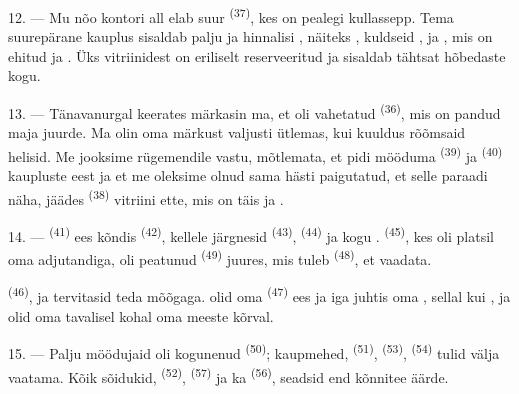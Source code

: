 12. --- Mu nõo kontori all elab suur 
\textsuperscript{(37)}, kes on pealegi kullassepp. Tema suurepärane kauplus sisaldab
palju  ja hinnalisi
, näiteks , kuldseid ,
 ja , mis on ehitud  ja
. Üks vitriinidest on eriliselt reserveeritud 
ja sisaldab tähtsat hõbedaste  kogu.

13. --- Tänavanurgal keerates märkasin ma, et oli vahetatud 
\textsuperscript{(36)}, mis on pandud maja  juurde. Ma olin oma märkust
valjusti ütlemas, kui kuuldus  rõõmsaid helisid. Me jooksime
rügemendile vastu, mõtlemata, et  pidi mööduma 
\textsuperscript{(39)} ja  \textsuperscript{(40)} kaupluste eest ja
et me oleksime olnud sama hästi paigutatud, et selle paraadi näha, jäädes
 \textsuperscript{(38)} vitriini ette, mis on täis  ja .

\VUsaut{3.0mm}

14. ---  \textsuperscript{(41)} ees kõndis 
\textsuperscript{(42)}, kellele järgnesid  \textsuperscript{(43)},
 \textsuperscript{(44)} ja kogu .
 \textsuperscript{(45)}, kes oli platsil oma adjutandiga, oli peatunud
 \textsuperscript{(49)} juures, mis tuleb 
\textsuperscript{(48)}, et  vaadata.

 \textsuperscript{(46)},  ja
 tervitasid teda mõõgaga.  olid oma
 \textsuperscript{(47)} ees ja iga  juhtis oma
, sellal kui ,  ja
 olid oma tavalisel kohal oma meeste kõrval.

15. --- Palju möödujaid oli kogunenud  \textsuperscript{(50)};
kaupmehed,  \textsuperscript{(51)}, 
\textsuperscript{(53)},  \textsuperscript{(54)} tulid välja
 vaatama. Kõik sõidukid,  \textsuperscript{(52)},
 \textsuperscript{(57)} ja ka 
\textsuperscript{(56)}, seadsid end kõnnitee äärde.

